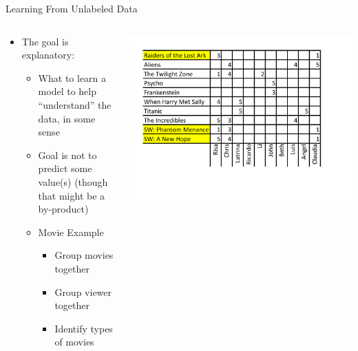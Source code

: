 \documentclass[aspectratio=169]{beamer}
\begin{document}
\begin{frame}{Learning From Unlabeled Data}

\begin{columns}
\begin{column}{0.5\textwidth}
\begin{itemize}
	\item The goal is explanatory: 
        \begin{itemize}
		\item What to learn a model to help ``understand'' the data, in some sense
		\item Goal is not to predict some value(s) (though that might be a by-product)
		\item Movie Example
		        \begin{itemize}
			\item Group movies together
			\item Group viewer together
			\item Identify types of movies
        			\end{itemize}
        \end{itemize}
\end{itemize}
\end{column}
\begin{column}{0.5\textwidth}
    \includegraphics[width=1\textwidth]{lectUL/movieGrid2} 
\end{column}
\end{columns}

\end{frame}
\end{document}

